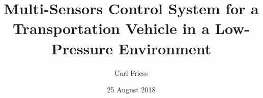 \documentclass[%
 oneside,      %
 openany,      %
 halfparskip,  %
]{scrbook}
\title{Multi-Sensors Control System for a Transportation Vehicle in a Low-Pressure Environment}
\author{Carl Friess}
\date{25 August 2018}
\begin{document}
\dominitoc

\frontmatter







\tableofcontents
\listoffigures
\listoftables



\mainmatter









\appendix



\backmatter



\nocite*{} %


\end{document}
